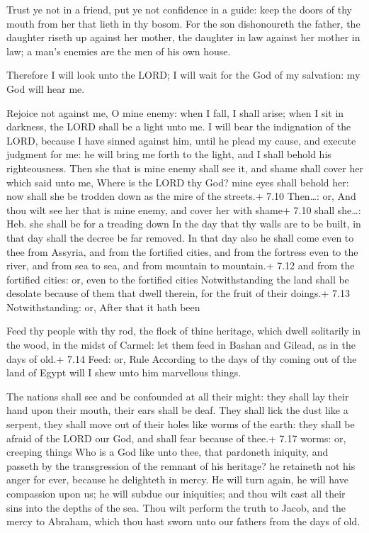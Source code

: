  Trust ye not in a friend, put ye not confidence in a
guide: keep the doors of thy mouth from her that lieth in thy bosom.
 For the son dishonoureth the father, the daughter riseth up
against her mother, the daughter in law against her mother in law; a
man's enemies are the men of his own house.

 Therefore I will look unto the LORD; I will wait for the
God of my salvation: my God will hear me.

 Rejoice not against me, O mine enemy: when I fall, I
shall arise; when I sit in darkness, the LORD shall be a light unto me.
 I will bear the indignation of the LORD, because I have
sinned against him, until he plead my cause, and execute judgment for
me: he will bring me forth to the light, and I shall behold his
righteousness.  Then she that is mine enemy shall see it,
and shame shall cover her which said unto me, Where is the LORD thy God?
mine eyes shall behold her: now shall she be trodden down as the mire of
the streets.+ 7.10 Then\ldots: or, And thou wilt see her that is mine
enemy, and cover her with shame+ 7.10 shall she\ldots: Heb. she shall be
for a treading down  In the day that thy walls are to be
built, in that day shall the decree be far removed.  In
that day also he shall come even to thee from Assyria, and from the
fortified cities, and from the fortress even to the river, and from sea
to sea, and from mountain to mountain.+ 7.12 and from the fortified
cities: or, even to the fortified cities  Notwithstanding
the land shall be desolate because of them that dwell therein, for the
fruit of their doings.+ 7.13 Notwithstanding: or, After that it hath
been

 Feed thy people with thy rod, the flock of thine
heritage, which dwell solitarily in the wood, in the midst of Carmel:
let them feed in Bashan and Gilead, as in the days of old.+ 7.14 Feed:
or, Rule  According to the days of thy coming out of the
land of Egypt will I shew unto him marvellous things.

 The nations shall see and be confounded at all their
might: they shall lay their hand upon their mouth, their ears shall be
deaf.  They shall lick the dust like a serpent, they shall
move out of their holes like worms of the earth: they shall be afraid of
the LORD our God, and shall fear because of thee.+ 7.17 worms: or,
creeping things  Who is a God like unto thee, that
pardoneth iniquity, and passeth by the transgression of the remnant of
his heritage? he retaineth not his anger for ever, because he delighteth
in mercy.  He will turn again, he will have compassion upon
us; he will subdue our iniquities; and thou wilt cast all their sins
into the depths of the sea.  Thou wilt perform the truth to
Jacob, and the mercy to Abraham, which thou hast sworn unto our fathers
from the days of old.
